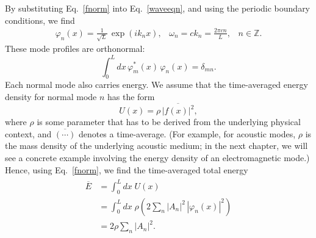 \documentclass[pra,12pt]{revtex4}
\begin{document}
By substituting Eq.~\eqref{fnorm} into Eq.~\eqref{waveeqn}, and using
the periodic boundary conditions, we find
\begin{align}
  \varphi_n(x) = \frac{1}{\sqrt{L}}\, \exp\left(ik_n x\right), \;\;\;
  \omega_n = c k_n = \frac{2\pi c n}{L}, \;\;\; n \in \mathbb{Z}.
  \label{classical_modes}
\end{align}
These mode profiles are orthonormal:
\begin{equation}
  \int_0^L dx \, \varphi_m^*(x) \, \varphi_n(x) = \delta_{mn}.
\end{equation}
Each normal mode also carries energy.  We assume that the
time-averaged energy density for normal mode $n$ has the form
\begin{equation}
  U(x) = \rho \, \overline{|f(x)|^2},
  \label{classical_energy_density}
\end{equation}
where $\rho$ is some parameter that has to be derived from the
underlying physical context, and $\overline{(\cdots)}$ denotes a
time-average.  (For example, for acoustic modes, $\rho$ is the mass
density of the underlying acoustic medium; in the next chapter, we
will see a concrete example involving the energy density of an
electromagnetic mode.)  Hence, using Eq.~\eqref{fnorm}, we find the
time-averaged total energy
\begin{align}
  \begin{aligned}
  \overline{E} &= \int_0^L dx \; U(x)\\
  &= \int_0^L dx \; \rho \left(2 \sum_n|A_n|^2 \, |\varphi_n(x)|^2\right)\\
  &= 2 \rho \sum_n |A_n|^2.
  \end{aligned}
  \label{classical_energy}
\end{align}
\end{document}
